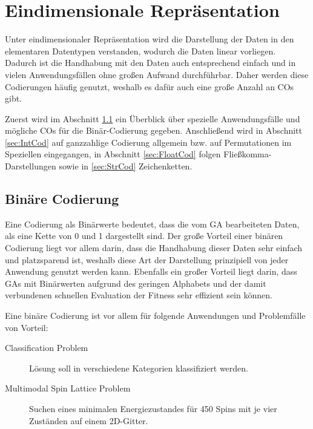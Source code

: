 
\section{Eindimensionale Repräsentation}
\label{sec:EindimRep}

Unter eindimensionaler Repräsentation wird die Darstellung der Daten in den elementaren Datentypen verstanden, wodurch die Daten linear vorliegen. Dadurch ist die Handhabung mit den Daten auch entsprechend einfach und in vielen Anwendungsfällen ohne großen Aufwand durchführbar. Daher werden diese Co\-die\-rungen häufig genutzt, weshalb es dafür auch eine große Anzahl an COs gibt.

Zuerst wird im Abschnitt \ref{sec:BinCod} ein Überblick über spezielle Anwendungsfälle und mög\-liche COs für die Binär-Codierung gegeben. Anschließend wird in Abschnitt \ref{sec:IntCod} auf ganzzahlige Codierung allgemein bzw. auf Permutationen im Speziellen eingegangen, in Abschnitt \ref{sec:FloatCod} folgen Fließkomma-Darstellungen sowie in \ref{sec:StrCod} Zeichenketten.

\subsection{Binäre Codierung}
\label{sec:BinCod}

	Eine Codierung als Binärwerte bedeutet, dass die vom GA bearbeiteten Daten, als eine Kette von 0 und 1 dargestellt sind. Der große Vorteil einer binären Codierung liegt vor allem darin, dass die Handhabung dieser Daten sehr einfach und platzsparend ist, weshalb diese Art der Darstellung prinzipiell von jeder Anwendung genutzt werden kann. Ebenfalls ein großer Vorteil liegt darin, dass GAs mit Binärwerten aufgrund des geringen Alphabets und der damit verbundenen schnellen Evaluation der Fitness sehr effizient sein können. \cite{TacklingRealCodedGA}
	
	Eine binäre Codierung ist \uA vor allem für folgende Anwendungen und Problemfälle von Vorteil: \cite{Survey}
	\begin{description}
		\item[Classification Problem] Lösung soll in verschiedene Kategorien klassifiziert werden. \cite{NearestNeighborClassifier}
		\item[Multimodal Spin Lattice Problem] Suchen eines minimalen Ener\-gie\-zu\-stan\-des für 450 Spins mit je vier Zuständen auf einem 2D-Gitter. \cite{SelectionSchemesSpatialIsolation}
	\end{description}
	
